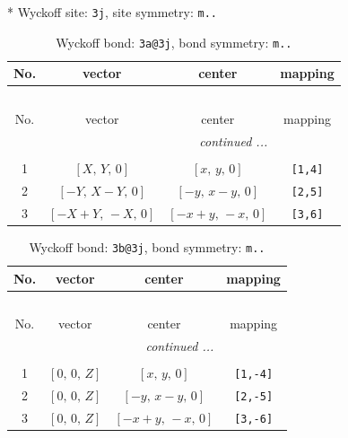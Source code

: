 \documentclass[fleqn,8pt]{jsarticle}
\begin{document}
* Wyckoff site: {\tt 3j}, site symmetry: {\tt m..}
\renewcommand{\arraystretch}{1.2}
\begin{longtable}{cccc}
\caption{Wyckoff bond: {\tt 3a@3j}, bond symmetry: {\tt m..}}
 \\
 \hline \hline
No. & vector & center & mapping \\ \hline \endfirsthead

\multicolumn{3}{l}{\tablename\ \thetable{}} \\
 \hline \hline
No. & vector & center & mapping \\ \hline \endhead

 \hline \hline
\multicolumn{3}{r}{\footnotesize\it continued ...} \\ \endfoot

 \hline \hline
\multicolumn{3}{r}{} \\ \endlastfoot

1 & $\left[ X,\, Y,\, 0 \right]$ & $\left[ x,\, y,\, 0 \right]$ & {\tt [1,4]} \\ \hline
2 & $\left[ - Y,\, X - Y,\, 0 \right]$ & $\left[ - y,\, x - y,\, 0 \right]$ & {\tt [2,5]} \\ \hline
3 & $\left[ - X + Y,\, - X,\, 0 \right]$ & $\left[ - x + y,\, - x,\, 0 \right]$ & {\tt [3,6]} \\
\end{longtable}
\renewcommand{\arraystretch}{1.2}
\begin{longtable}{cccc}
\caption{Wyckoff bond: {\tt 3b@3j}, bond symmetry: {\tt m..}}
 \\
 \hline \hline
No. & vector & center & mapping \\ \hline \endfirsthead

\multicolumn{3}{l}{\tablename\ \thetable{}} \\
 \hline \hline
No. & vector & center & mapping \\ \hline \endhead

 \hline \hline
\multicolumn{3}{r}{\footnotesize\it continued ...} \\ \endfoot

 \hline \hline
\multicolumn{3}{r}{} \\ \endlastfoot

1 & $\left[ 0,\, 0,\, Z \right]$ & $\left[ x,\, y,\, 0 \right]$ & {\tt [1,-4]} \\ \hline
2 & $\left[ 0,\, 0,\, Z \right]$ & $\left[ - y,\, x - y,\, 0 \right]$ & {\tt [2,-5]} \\ \hline
3 & $\left[ 0,\, 0,\, Z \right]$ & $\left[ - x + y,\, - x,\, 0 \right]$ & {\tt [3,-6]} \\
\end{longtable}
\end{document}
